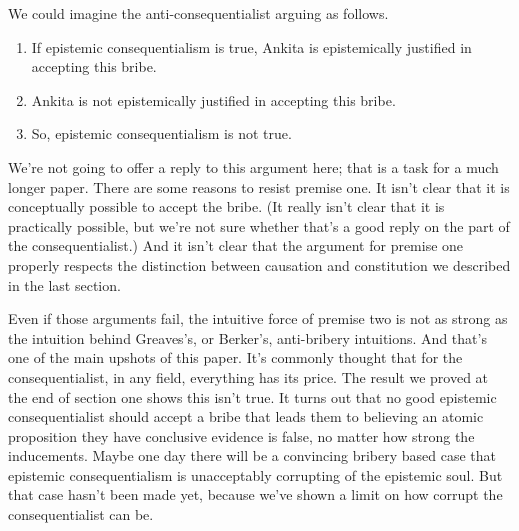 \documentclass[
  11pt,
  letterpaper,
  DIV=11,
  numbers=noendperiod,
  oneside]{scrartcl}
\providecommand{\tightlist}{%
  \setlength{\itemsep}{0pt}\setlength{\parskip}{0pt}}\usepackage{longtable,booktabs,array}
\begin{document}
We could imagine the anti-consequentialist arguing as follows.

\begin{enumerate}
\def\labelenumi{\arabic{enumi}.}
\tightlist
\item
  If epistemic consequentialism is true, Ankita is epistemically
  justified in accepting this bribe.
\item
  Ankita is not epistemically justified in accepting this bribe.
\item
  So, epistemic consequentialism is not true.
\end{enumerate}

We're not going to offer a reply to this argument here; that is a task
for a much longer paper. There are some reasons to resist premise one.
It isn't clear that it is conceptually possible to accept the bribe. (It
really isn't clear that it is practically possible, but we're not sure
whether that's a good reply on the part of the consequentialist.) And it
isn't clear that the argument for premise one properly respects the
distinction between causation and constitution we described in the last
section.

Even if those arguments fail, the intuitive force of premise two is not
as strong as the intuition behind Greaves's, or Berker's, anti-bribery
intuitions. And that's one of the main upshots of this paper. It's
commonly thought that for the consequentialist, in any field, everything
has its price. The result we proved at the end of section one shows this
isn't true. It turns out that no good epistemic consequentialist should
accept a bribe that leads them to believing an atomic proposition they
have conclusive evidence is false, no matter how strong the inducements.
Maybe one day there will be a convincing bribery based case that
epistemic consequentialism is unacceptably corrupting of the epistemic
soul. But that case hasn't been made yet, because we've shown a limit on
how corrupt the consequentialist can be.

\end{document}
